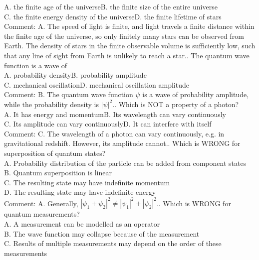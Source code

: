 \documentclass[12pt]{book} %
\numberwithin{equation}{chapter}
\def\mc{\hspace{0.5cm}}
\begin{document}
A. the finite age of the universe\mc B. the finite size of the entire universe\\
C. the finite energy density of the universe\mc D. the finite lifetime of stars\\
Comment: A. The speed of light is finite, and light travels a finite distance within the finite age of the universe, so only finitely many stars can be observed from Earth. The density of stars in the finite observable volume is sufficiently low, such that any line of sight from Earth is unlikely to reach a star.\bigskip{}. The quantum wave function is a wave of\\
A. probability density\mc B. probability amplitude\\
C. mechanical oscillation\mc D. mechanical oscillation amplitude\\
Comment: B. The quantum wave function $\psi$ is a wave of probability amplitude, while the probability density is $\left|\psi\right|^{2}$.\bigskip{}. Which is NOT a property of a photon?\\
A. It has energy and momentum\mc B. Its wavelength can vary continuously\\
C. Its amplitude can vary continuously\mc D. It can interfere with itself\\
Comment: C. The wavelength of a photon can vary continuously, e.g. in gravitational redshift. However, its amplitude cannot.\bigskip{}. Which is WRONG for superposition of quantum states?\\
A. Probability distribution of the particle can be added from component states\\
B. Quantum superposition is linear\\
C. The resulting state may have indefinite momentum\\
D. The resulting state may have indefinite energy\\
Comment: A. Generally, $\left|\psi_{1}+\psi_{2}\right|^{2}\neq\left|\psi_{1}\right|^{2}+\left|\psi_{2}\right|^{2}$.\bigskip{}. Which is WRONG for quantum measurements?\\
A. A measurement can be modelled as an operator\\
B. The wave function may collapse because of the measurement\\
C. Results of multiple measurements may depend on the order of these measurements\\
\end{document}
